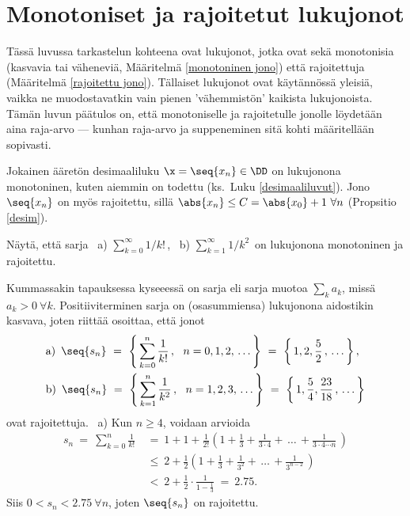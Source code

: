 \section{Monotoniset ja rajoitetut lukujonot}
\label{monotoniset jonot}
\alku
{} 
 

Tässä luvussa tarkastelun kohteena ovat lukujonot, jotka ovat sekä monotonisia (kasvavia tai 
väheneviä, Määritelmä \ref{monotoninen jono}) että rajoitettuja (Määritelmä 
\ref{rajoitettu jono}). Tällaiset lukujonot ovat käytännössä yleisiä, vaikka ne muodostavatkin
vain pienen 'vähemmistön' kaikista lukujonoista. Tämän luvun päätulos on, että monotoniselle
ja rajoitetulle jonolle löydetään aina raja-arvo --- kunhan raja-arvo ja suppeneminen sitä kohti
määritellään sopivasti.
\begin{Exa} \label{desimaaliluku on rajoitettu jono} Jokainen ääretön desimaaliluku 
$\x=\seq{x_n}\in\DD$ on lukujonona monotoninen, kuten aiemmin on todettu 
(ks.\ Luku \ref{desimaaliluvut}). Jono $\seq{x_n}$ on myös rajoitettu, sillä 
$\abs{x_n} \le C = \abs{x_0}+1\ \forall n$ (Propsitio \ref{desim}). \loppu
\end{Exa}
\begin{Exa} \label{kaksi sarjaa} Näytä, että sarja \ a) $\sum_{k=0}^\infty 1/k!\,$, \ 
b) $\sum_{k=1}^\infty 1/k^2\,$ on lukujonona monotoninen ja rajoitettu. \end{Exa}
\ratk Kummassakin tapauksessa kyseeessä on
%
 sarja eli sarja muotoa $\sum_k a_k$, missä $a_k>0\ \forall k$.
Positiiviterminen sarja on (osasummiensa) lukujonona aidostikin kasvava, joten riittää
osoittaa, että jonot
\begin{align*}
&\text{a)}\,\ \seq{s_n}\ =\ \left\{\,\sum_{k=0}^n \frac{1}{k!}\,,\ \ n=0,1,2,\,\ldots\,\right\}\
                         =\ \left\{\,1,2,\frac{5}{2}\,,\,\ldots\,\right\}, \\
&\text{b)}\,\ \seq{s_n}\ =\ \left\{\,\sum_{k=1}^n \frac{1}{k^2}\,,\ \ n=1,2,3,\,\ldots\,\right\}\
                         =\ \left\{\,1,\frac{5}{4},\frac{23}{18}\,,\,\ldots\,\right\}
\end{align*}
ovat rajoitettuja. \ a) Kun $n \ge 4$, voidaan arvioida
\begin{align*}
s_n\  =\ \sum_{k=0}^n \frac{1}{k!}\ 
     &=\ 1 + 1 + \frac{1}{2!}\left(1+\frac{1}{3}+\frac{1}{3\cdot 4}+\,\ldots\,
                                                +\frac{1}{3\cdot 4 \cdots n}\,\right) \\
     &\le\ 2 + \frac{1}{2}\left(1+\frac{1}{3}+\frac{1}{3^2}+\,\ldots\,
                                               +\frac{1}{3^{n-2}}\,\right) \\[1mm]
     &<\ 2 + \frac{1}{2}\cdot\frac{1}{1-\frac{1}{3}}\ =\ 2.75.
\end{align*}
Siis $0 < s_n < 2.75\ \forall n$, joten $\seq{s_n}$ on rajoitettu.

